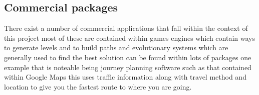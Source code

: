 \subsection{Commercial packages}
There exist a number of commercial applications that fall within the context of this project most of these are contained within  games engines which contain ways to generate levels and to build paths and evolutionary systems which are generally used to find the best solution can be found within lots of packages one example that is noteable being journey planning software such as that contained within Google Maps this uses traffic information along with travel method and location to give you the fastest route to where you are going. 

\pagebreak

